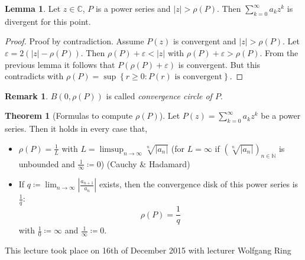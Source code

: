 \documentclass[a4paper,landscape,twocolumn]{article}
\theoremstyle{definition}
\newtheorem{theorem}{Theorem}
\newtheorem{rem}{Remark}
\newtheorem{lemma}{Lemma}
\newcommand\set[1]{\left\{#1\right\}}
\newcommand\abs[1]{\left|#1\right|}
\newcommand\seq[1]{{\left(#1\right)}_{n \in \mathbb N}}
\newcommand\meta[3]{\begin{mdframed}[skipbelow=4pt,skipabove=4pt,innermargin=1pt,innerleftmargin=1pt,innerrightmargin=1pt]\begin{center}\small{\textdownarrow{} This #1 took place on #2 with lecturer #3}\end{center}\end{mdframed}}
\begin{document}
\begin{lemma}
  Let $z \in \mathbb C$, $P$ is a power series and $\abs{z} > \rho(P)$.
  Then $\sum_{k=0}^\infty a_k z^k$ is divergent for this point.
\end{lemma}
\begin{proof}
  Proof by contradiction. Assume $P(z)$ is convergent and $\abs{z} > \rho(P)$.
  Let $\varepsilon = 2(\abs{z} - \rho(P))$. Then $\rho(P) + \varepsilon < \abs{z}$
  with $\rho(P) + \varepsilon > \rho(P)$. From the previous lemma it follows that
  $P(\rho(P) + \varepsilon)$ is convergent. But this contradicts with $\rho(P)
  = \sup\set{r \geq 0: P(r) \text{ is convergent}}$.
\end{proof}
\begin{rem}
  $B(0,\rho(P))$ is called \emph{convergence circle of $P$}.
\end{rem}
\begin{theorem}[Formulas to compute $\rho(P)$]
  Let $P(z) = \sum_{k=0}^\infty a_k z^k$ be a power series.
  Then it holds in every case that,
  \begin{itemize}
    \item $\rho(P) = \frac{1}{L}$ with $L = \limsup_{n\to\infty} \sqrt[n]{\abs{a_n}}$
      (for $L = \infty$ if $\seq{\sqrt[n]{\abs{a_n}}}$ is unbounded and $\frac{1}{\infty} \coloneqq 0$)
      (Cauchy \& Hadamard)
    \item
      If $q \coloneqq \lim_{n\to\infty} \abs{\frac{a_{n+1}}{a_n}}$ exists,
      then the convergence disk of this power series is $\frac1q$:
      \[ \rho(P) = \frac{1}{q} \]
      with $\frac10 \coloneqq \infty$ and $\frac1{\infty} \coloneqq 0$.
  \end{itemize}
\end{theorem}

\meta{lecture}{16th of December 2015}{Wolfgang Ring}
\end{document}
